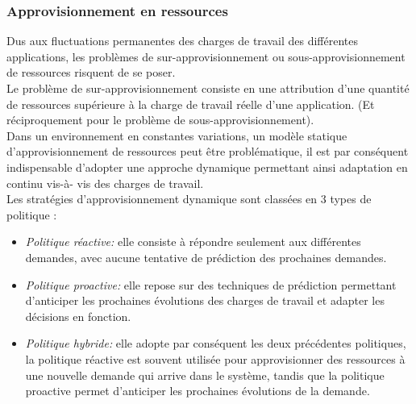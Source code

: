 \subsubsection{Approvisionnement en ressources}
Dus aux fluctuations permanentes des charges de travail des différentes applications, les problèmes de sur-approvisionnement ou sous-approvisionnement de  ressources risquent de se poser.\\
Le problème de sur-approvisionnement consiste en une attribution d'une quantité de ressources supérieure à la charge de travail réelle d'une application. (Et réciproquement pour le problème de sous-approvisionnement).\\
Dans un environnement en constantes variations,  un modèle statique d'approvisionnement de ressources peut être problématique, il est par conséquent indispensable d'adopter une approche dynamique permettant ainsi adaptation en continu vis-à- vis des charges de travail.\\ 
Les stratégies d'approvisionnement dynamique sont classées en 3 types de politique :
\begin{itemize}
  \item \emph{Politique réactive:} elle consiste à répondre seulement aux différentes demandes, avec aucune tentative de prédiction des prochaines demandes.
  \item \emph{Politique proactive:} elle repose sur des techniques de prédiction permettant d'anticiper les prochaines évolutions des charges de travail et adapter les décisions en fonction.
  \item \emph{Politique hybride:} elle adopte par conséquent les deux précédentes politiques,  la politique réactive est souvent utilisée pour approvisionner des ressources à une nouvelle demande qui arrive dans le système, tandis que la politique proactive permet d'anticiper les prochaines évolutions de la demande. 
\end{itemize}
